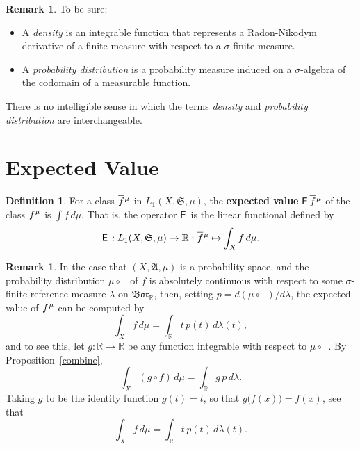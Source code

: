 \documentclass[
twoside=true,
paper=letter,
fontsize=9pt,
pagesize=auto,
leqno,
openany,
headsepline,
overfullrule,
]{scrbook}
\theoremstyle{plain}
\theoremstyle{plain}
\theoremstyle{definition}
\newtheorem{defn}[thm]{Definition}
\newtheorem{rmk}[thm]{Remark}
\theoremstyle{bfnoteitalic}
\theoremstyle{bfnoteroman}
\newcommand{\term}[1]{\textbf{#1}\index{#1}}
\newcommand{\sigalg}[1]{\mathfrak{#1}}
\newcommand{\sfop}[1]{\mathsf{#1}}
\newcommand{\expval}{\sfop{E}\,}
\newcommand{\borel}{\mathfrak{Bor}}
\newcommand{\textsigma}{\hbox{\large{$\sigma$}}\kern-1pt}
\newcommand{\preimage}[1]{\mathop{#1^{\leftarrow}}}
\newcommand{\R}{\mathbb{R}}
\newcommand{\semiring}{\sigalg{S}}
\newcommand{\sigmaalgebra}{\sigalg{A}}
\newcommand{\funcf}{f}
\newcommand{\funcg}{g}
\newcommand{\function}{f}
\newcommand{\measurespace}{X}
\newcommand{\measure}{\mu}
\newcommand{\measmu}{\mu}
\newcommand{\measlambda}{\lambda}
\newcommand*\xbar[1]{%
   \hbox{%
     \vbox{%
       \hrule height 0.4pt %
       \kern0.4ex%
       \hbox{%
         \ensuremath{#1}%
       }%
     }%
   }%
}
\newcommand{\lebclass}[1]{\hspace{.5pt}\xbar{#1}\hspace{0.5pt}}
\newcommand{\ellclass}[2]{\lebclass{#1}^{#2}}
\begin{document}
\begin{rmk}
To be sure:
\begin{itemize}
\item A \emph{density} is an integrable function that represents a Radon-Nikodym derivative of a finite measure with respect to  a \textsigma-finite measure.
\item A \emph{probability distribution} is a probability measure induced on a \textsigma-algebra of the codomain of a measurable function.
\end{itemize}
There is no intelligible sense in which the terms \emph{density} and \emph{probability distribution} are interchangeable.
\end{rmk}


\section{Expected Value}
\begin{defn}\label{expected_value}
For a class $\ellclass{\function}{\measure}$ in $L_1(\measurespace, \semiring,\measure)$, the
\term{expected value} $\expval{\ellclass{\function}{\measure}}$ of the class
$\ellclass{\function}{\measure}$ is
$\int\function\,d\mu$. That is, the operator $\expval$ is the linear functional defined by
\[
\expval:
L_1(\measurespace, \semiring,\measure)\to\R :
\ellclass{\function}{\measure}\mapsto \int_\measurespace \function\, d\measure.
\]
\end{defn}



\begin{rmk}\label{expected_value_probability}
In the case that
$(\measurespace,\sigmaalgebra,\measure)$ is a probability space, and
the probability distribution
$\measmu\circ\preimage{\funcf}$ of $\funcf$ is absolutely continuous with respect to some
\textsigma\hyp{}finite reference measure
$\measlambda$ on $\borel_\R$, then,
setting
$p = d(\measmu\circ\preimage{\funcf})/d \measlambda$,
the expected value of $\ellclass{\funcf}{\measure}$ can be computed by
\[
\int_\measurespace \funcf \, d\measmu
=
\int_\R t \, p(t) \, d\measlambda(t),
\]
and to see this, let $\funcg:\R \to\R$ be any function integrable with respect to
$\measmu\circ\preimage{\funcf}$.  By Proposition~\ref{combine},
\[
\int_\measurespace (\funcg \circ \funcf)\, d\measmu
=
\int_\R \funcg \, p \, d\measlambda.
\]
Taking $\funcg$ to be the identity function $\funcg(t)=t$, so that
$\funcg \bigl( \funcf(x)\bigr) = \funcf(x)$, see that
\[
\int_\measurespace \funcf \, d\measmu
=
\int_\R t \, p(t) \, d\measlambda(t).
\]
\end{rmk}
\end{document}
